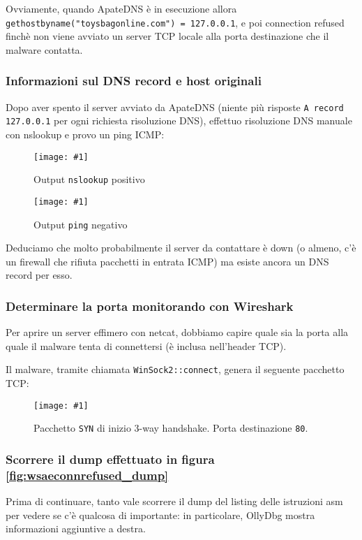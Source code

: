 \documentclass[
    a4paper, %
    11pt %
]{article}
\newcommand{\pic}[4]{\begin{figure}[H]
            \centering
            \texttt{[image: \#1]}
            \caption{#2}
            \label{fig:#1}
            \end{figure}}
\begin{document}
            Ovviamente, quando ApateDNS è in esecuzione allora \texttt{gethostbyname("toysbagonline.com") = 
            127.0.0.1}, e poi connection refused finchè non viene avviato un server TCP locale alla porta destinazione
            che il malware contatta.
            
            \subsubsection{Informazioni sul DNS record e host originali}
            
            Dopo aver spento il server avviato da ApateDNS (niente più risposte \texttt{A record 127.0.0.1} per ogni richiesta risoluzione DNS), effettuo risoluzione DNS manuale con nslookup e provo
            un ping ICMP:

            \pic{dnsresolveok}{Output \texttt{nslookup} positivo}{13cm}{5cm}
            \pic{icmpfail}{Output \texttt{ping} negativo}{13cm}{5cm}

            Deduciamo che molto probabilmente il server da contattare è down (o almeno, c'è un firewall che rifiuta pacchetti in entrata ICMP) ma esiste ancora un DNS record per esso.
            
            \pagebreak

            \subsubsection{Determinare la porta monitorando con Wireshark}

            Per aprire un server effimero con netcat, dobbiamo capire quale sia la porta alla quale il malware
            tenta di connettersi (è inclusa nell'header TCP).

            Il malware, tramite chiamata \texttt{WinSock2::connect}, genera il seguente pacchetto TCP:

            \pic{dstport}{Pacchetto \texttt{SYN} di inizio 3-way handshake. Porta destinazione \texttt{80}.}{17cm}{4cm}

            \subsubsection{Scorrere il dump effettuato in figura \ref{fig:wsaeconnrefused_dump}}\label{sect:dump_analyze}
            
            Prima di continuare, tanto vale scorrere il dump del listing delle istruzioni asm per vedere se c'è
            qualcosa di importante: in particolare, OllyDbg mostra informazioni aggiuntive a destra.
\end{document}
